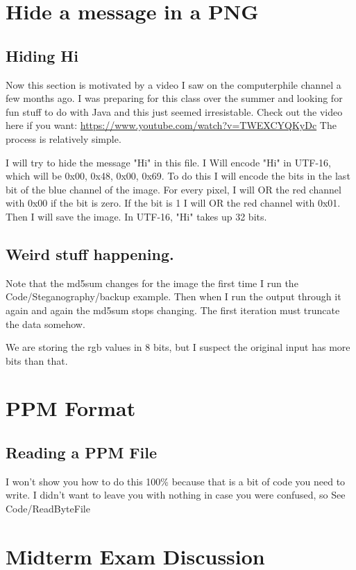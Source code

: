 \documentclass[12pt]{article}
\begin{document}
\section{Hide a message in a PNG}

\subsection{Hiding Hi}
Now this section is motivated by a video I saw on the computerphile channel a few months ago. I was preparing for this class over the summer and looking for fun stuff to do with Java and this just seemed irresistable. Check out the video here if you want: \url{https://www.youtube.com/watch?v=TWEXCYQKyDc} The process is relatively simple. 


I will try to hide the message "Hi" in this file. I Will encode "Hi" in UTF-16, which will be 0x00, 0x48, 0x00, 0x69. To do this I will encode the bits in the last bit of the blue channel of the image. For every  pixel, I will OR the red channel with 0x00 if the bit is zero. If the bit is 1 I will OR the red channel with 0x01. Then I will save the image. In UTF-16, "Hi" takes up 32 bits.


\subsection{Weird stuff happening.}
Note that the md5sum changes for the image the first time I run the Code/Steganography/backup example. Then when I run the output through it again and again the md5sum stops changing. The first iteration must truncate the data somehow.

We are storing the rgb values in 8 bits, but I suspect the original input has more bits than that.



\section{PPM Format}

\subsection{Reading a PPM File}

I won't show you how to do this 100\% because that is a bit of code you need to write. I didn't want to leave you with nothing in case you were confused, so See Code/ReadByteFile
\section{Midterm Exam Discussion}
\end{document}

